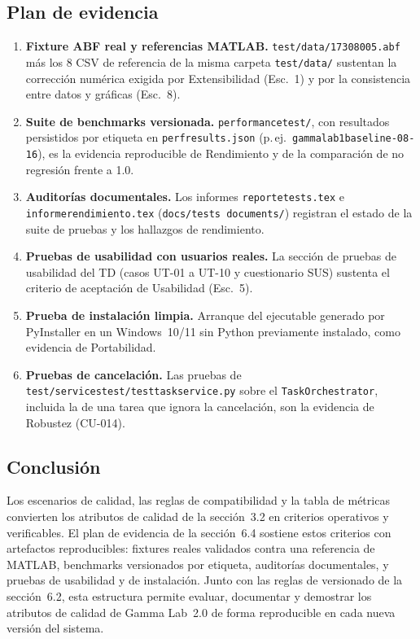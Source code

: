 \documentclass[11pt,a4paper]{article}
\DeclareRobustCommand{\_}{\textunderscore\allowbreak}
\begin{document}
\subsection{Plan de evidencia}
\begin{enumerate}
    \item \textbf{Fixture ABF real y referencias MATLAB.} \texttt{test/data/17308005.abf} m\'as los 8 CSV de referencia de la misma carpeta \texttt{test/\allowbreak data/} sustentan la correcci\'on num\'erica exigida por Extensibilidad (Esc.~1) y por la consistencia entre datos y gr\'aficas (Esc.~8).
    \item \textbf{Suite de benchmarks versionada.} \texttt{performance\_\allowbreak test/}, con resultados persistidos por etiqueta en \texttt{perf\_\allowbreak results.json} (p.\,ej.\ \texttt{gammalab1\_\allowbreak baseline\_-08-16}), es la evidencia reproducible de Rendimiento y de la comparaci\'on de no regresi\'on frente a 1.0.
    \item \textbf{Auditor\'ias documentales.} Los informes \texttt{reporte\_\allowbreak tests.\allowbreak tex} e \texttt{informe\_\allowbreak rendimiento.\allowbreak tex} (\texttt{docs/\allowbreak tests documents/}) registran el estado de la suite de pruebas y los hallazgos de rendimiento.
    \item \textbf{Pruebas de usabilidad con usuarios reales.} La secci\'on de pruebas de usabilidad del TD (casos UT-01 a UT-10 y cuestionario SUS) sustenta el criterio de aceptaci\'on de Usabilidad (Esc.~5).
    \item \textbf{Prueba de instalaci\'on limpia.} Arranque del ejecutable generado por PyInstaller en un Windows~10/11 sin Python previamente instalado, como evidencia de Portabilidad.
    \item \textbf{Pruebas de cancelaci\'on.} Las pruebas de \texttt{test/\allowbreak services\_\allowbreak test/\allowbreak test\_\allowbreak task\_\allowbreak service.py} sobre el \texttt{Task\-Orchestrator}, incluida la de una tarea que ignora la cancelaci\'on, son la evidencia de Robustez (CU-014).
\end{enumerate}

\subsection{Conclusi\'on}

Los escenarios de calidad, las reglas de compatibilidad y la tabla de m\'etricas convierten los atributos de calidad de la secci\'on~3.2 en criterios operativos y verificables. El plan de evidencia de la secci\'on~6.4 sostiene estos criterios con artefactos reproducibles: fixtures reales validados contra una referencia de MATLAB, benchmarks versionados por etiqueta, auditor\'ias documentales, y pruebas de usabilidad y de instalaci\'on. Junto con las reglas de versionado de la secci\'on~6.2, esta estructura permite evaluar, documentar y demostrar los atributos de calidad de Gamma Lab~2.0 de forma reproducible en cada nueva versi\'on del sistema.
\end{document}
